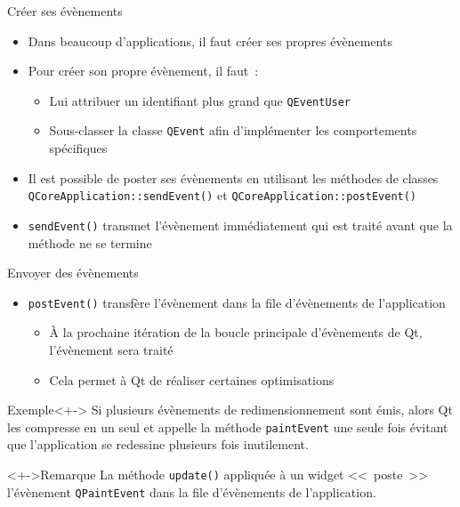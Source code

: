 \documentclass{beamer} %
\begin{document}
\begin{frame}{Créer ses évènements}
	\begin{itemize}
	 \item<+-> Dans beaucoup d'applications, il faut créer ses propres évènements
	 \item<+-> Pour créer son propre évènement, il faut~:
	 	\begin{itemize}
	 	\item<+-> Lui attribuer un identifiant plus grand que \texttt{QEventUser}
	 	\item<+-> Sous-classer la classe \texttt{QEvent} afin d'implémenter les comportements spécifiques
		\end{itemize}
	 \item<+-> Il est possible de poster ses évènements en utilisant les méthodes de classes \texttt{QCoreApplication::sendEvent()} et \texttt{QCoreApplication::postEvent()}
	 \item<+-> \texttt{sendEvent()} transmet l'évènement immédiatement qui est traité avant que la méthode ne se termine
	\end{itemize}
\end{frame}

\begin{frame}{Envoyer des évènements}
	\begin{itemize}
	 \item<+-> \texttt{postEvent()} transfère l'évènement dans la file d'évènements de l'application
		\begin{itemize}
		 \item<+->[$\Rightarrow$] À la prochaine itération de la boucle principale d'évènements de Qt, l'évènement sera traité
		 \item<+->[$\Rightarrow$] Cela permet à Qt de réaliser certaines optimisations
		\end{itemize}
	\end{itemize}
\begin{exampleblock}{Exemple}<+->
Si plusieurs évènements de redimensionnement sont émis, alors Qt les compresse en un seul et appelle la méthode \texttt{paintEvent} une seule fois évitant que l'application se redessine plusieurs fois inutilement.
\end{exampleblock}
\begin{alertblock}<+->{Remarque}
La méthode \texttt{update()} appliquée à un widget <<~poste~>> l'évènement \texttt{QPaintEvent} dans la file d'évènements de l'application.
\end{alertblock}

\end{frame}
\end{document}
